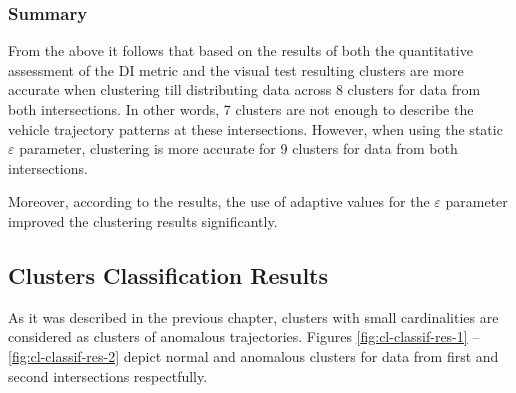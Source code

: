 \subsubsection{Summary}

From the above it follows that based on the results of both the quantitative assessment of the DI metric and the visual test resulting clusters are more accurate when clustering till distributing data across 8 clusters for data from both intersections. In other words, 7 clusters are not enough to describe the vehicle trajectory patterns at these intersections. However, when using the static $\varepsilon$ parameter, clustering is more accurate for 9 clusters for data from both intersections.

Moreover, according to the results, the use of adaptive values for the $\varepsilon$ parameter improved the clustering results significantly.

\subsection{Clusters Classification Results}

As it was described in the previous chapter, clusters with small cardinalities are considered as clusters of anomalous trajectories. Figures \ref{fig:cl-classif-res-1} -- \ref{fig:cl-classif-res-2} depict normal and anomalous clusters for data from first and second intersections respectfully.

